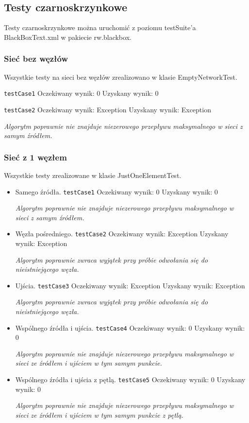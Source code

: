 \subsection{Testy czarno\dywiz skrzynkowe}

Testy czarnoskrzynkowe można uruchomić z poziomu testSuite'a BlackBoxText.xml
w pakiecie rw.blackbox.

\subsubsection{Sieć bez węzłów}
Wszystkie testy na sieci bez węzłów zrealizowano w klasie EmptyNetworkTest.

\texttt{testCase1}
Oczekiwany wynik: 0
Uzyskany wynik: 0

\texttt{testCase2}
Oczekiwany wynik: Exception
Uzyskany wynik: Exception

\emph{Algorytm poprawnie nie znajduje niezerowego przepływu maksymalnego w sieci
z samym źródłem.}

\subsubsection{Sieć z 1 węzłem}
Wszystkie testy zrealizowane w klasie JustOneElementTest.
\begin{itemize}[nosep]
    \item Samego źródła.
    \texttt{testCase1}
    Oczekiwany wynik: 0
    Uzyskany wynik: 0

    \emph{Algorytm poprawnie nie znajduje niezerowego przepływu maksymalnego w sieci
    z samym źródłem.}

    \item Węzła pośredniego.
    \texttt{testCase2}
    Oczekiwany wynik: Exception
    Uzyskany wynik: Exception

    \emph{Algorytm poprawnie zwraca wyjątek przy próbie odwołania się
    do nieistniejącego węzła.}

    \item Ujścia.
    \texttt{testCase3}
    Oczekiwany wynik: Exception
    Uzyskany wynik: Exception

    \emph{Algorytm poprawnie zwraca wyjątek przy próbie odwołania się
    do nieistniejącego węzła.}

    \item Wspólnego źródła i ujścia.
    \texttt{testCase4}
    Oczekiwany wynik: 0
    Uzyskany wynik: 0

    \emph{Algorytm poprawnie nie znajduje niezerowego przepływu maksymalnego
    w sieci ze źródłem i ujściem w tym samym punkcie.}

    \item Wspólnego źródła i ujścia z pętlą.
    \texttt{testCase5}
    Oczekiwany wynik: 0
    Uzyskany wynik: 0

    \emph{Algorytm poprawnie nie znajduje niezerowego przepływu maksymalnego
    w sieci ze źródłem i ujściem w tym samym punkcie z pętlą.}
\end{itemize}


